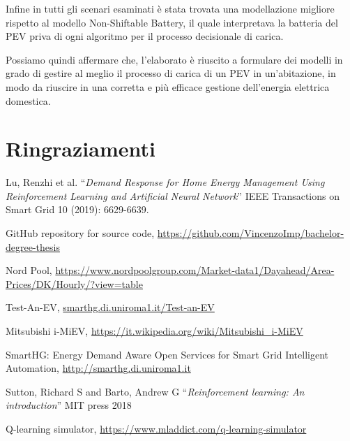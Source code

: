 \documentclass[italian, Lau, oneside]{sapthesis}
\begin{document}
Infine in tutti gli scenari esaminati è stata trovata una modellazione migliore rispetto al modello Non-Shiftable Battery, il quale interpretava la batteria del PEV priva di ogni algoritmo per il processo decisionale di carica.

Possiamo quindi affermare che, l'elaborato è riuscito a formulare dei modelli in grado di gestire al meglio il processo di carica di un PEV in un'abitazione, in modo da riuscire in una corretta e più efficace gestione dell'energia elettrica domestica.








\chapter*{Ringraziamenti}



\backmatter
{}


\begin{thebibliography}{17}

Lu, Renzhi et al. “\textit{Demand Response for Home Energy Management Using Reinforcement Learning and Artificial Neural Network}” IEEE Transactions on Smart Grid 10 (2019): 6629-6639.

 GitHub repository for source code, \url{https://github.com/VincenzoImp/bachelor-degree-thesis}

 Nord Pool, \url{https://www.nordpoolgroup.com/Market-data1/Dayahead/Area-Prices/DK/Hourly/?view=table}

 Test-An-EV, \url{smarthg.di.uniroma1.it/Test-an-EV}

 Mitsubishi i-MiEV, \url{https://it.wikipedia.org/wiki/Mitsubishi_i-MiEV}

SmartHG: Energy Demand Aware Open Services for Smart Grid Intelligent Automation, \url{http://smarthg.di.uniroma1.it}

\bibitem{} Sutton, Richard S and Barto, Andrew G “\textit{Reinforcement learning: An introduction}” MIT press 2018


 Q-learning simulator, \url{https://www.mladdict.com/q-learning-simulator}






\end{thebibliography}
\end{document}
